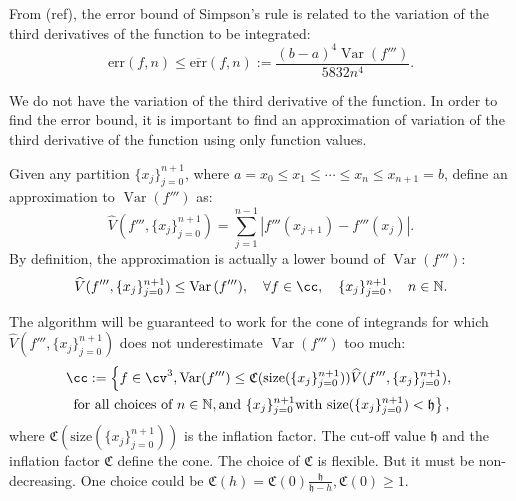 \documentclass{iitthesis}
\DeclareMathOperator{\Var}{Var}
\theoremstyle{definition}
\theoremstyle{remark}
\begin{document}

From (ref), the error bound of Simpson's rule is related to the variation of the third derivatives of the function to be integrated:
\begin{equation}\label{errorboundSimpson}
    \text{err}(f,n)\le\overline{\text{err}}(f,n):=\frac{(b-a)^4\Var(f''')}{5832n^4}.
\end{equation}

We do not have the variation of the third derivative of the function. In order to find the error bound, it is important to find an approximation of variation of the third derivative of the function using only function values.

Given any partition $\{x_j\}_{j=0}^{n+1}$, where $a=x_{0}\le x_{1}\le\cdots\le x_{n}\le x_{n+1}=b$, define an approximation to $\Var(f''')$ as:
$$\widehat{V}(f''',\{x_j\}_{j=0}^{n+1})=\sum_{j=1}^{n-1}|f'''(x_{j+1})-f'''(x_{j})|.$$
By definition, the approximation is actually a lower bound of $\Var(f''')$:
\begin{equation}\label{vhatlessvar}
    \widehat{V}(f''',\{x_j\}_{j=0}^{n+1})\leq\Var{(f''')}, \quad \forall f \in \cc, \quad \{x_j\}_{j=0}^{n+1}, \quad n \in \mathbb{N}.
\end{equation}

The algorithm will be guaranteed to work for the cone of integrands for which $\widehat{V}(f''',\{x_j\}_{j=0}^{n+1})$ does not underestimate $\Var{(f''')}$ too much:
\begin{multline}\label{coneinteg}
\cc:=\left\{f\in \cv^{3}, \Var(f''')\leq \mathfrak{C}(\text{size}(\{x_j\}_{j=0}^{n+1}))\widehat{V}(f''',\{x_j\}_{j=0}^{n+1}),\right.\\ \left.\text{for all choices of } n\in \mathbb{N}, \text{and }\{x_j\}_{j=0}^{n+1} \text{with }\text{size}(\{x_j\}_{j=0}^{n+1})<\mathfrak{h}\right\},
\end{multline}
where $\mathfrak{C}(\text{size}(\{x_j\}_{j=0}^{n+1}))$ is the inflation factor. The cut-off value $\mathfrak{h}$ and the inflation factor $\mathfrak{C}$ define the cone. The choice of $\mathfrak{C}$ is flexible. But it must be non-decreasing. One choice could be $\mathfrak{C}(h)=\mathfrak{C}(0)\frac{\mathfrak{h}}{\mathfrak{h}-h}, \mathfrak{C}(0)\ge1$.
\end{document}
